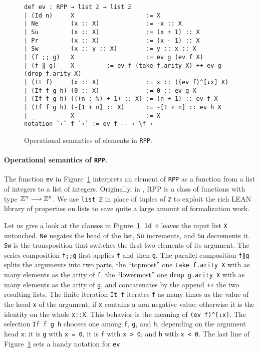 \documentclass[runningheads]{llncs}
\newcommand{\RPP}{\textsf{RPP}\xspace}
\newcommand{\LEAN}{\textsf{LEAN}\xspace}
\begin{document}
\begin{figure}
\begin{lstlisting}
def ev : RPP → list ℤ → list ℤ
| (Id n)     X                    := X
| Ne         (x :: X)             := -x :: X
| Su         (x :: X)             := (x + 1) :: X
| Pr         (x :: X)             := (x - 1) :: X
| Sw         (x :: y :: X)        := y :: x :: X
| (f ;; g)   X                    := ev g (ev f X)
| (f ‖ g)    X         := ev f (take f.arity X) ++ ev g (drop f.arity X)
| (It f)     (x :: X)             := x :: ((ev f)^[↓x] X)
| (If f g h) (0 :: X)             := 0 :: ev g X
| (If f g h) (((n : ℕ) + 1) :: X) := (n + 1) :: ev f X
| (If f g h) (-[1 + n] :: X)      := -[1 + n] :: ev h X
| _          X                    := X
notation `‹` f `›` := ev f -- ‹ \f ›
\end{lstlisting}
\caption{Operational semantics of elements in \lstinline|RPP|.}
\label{fig:RPP-ev}
\end{figure}

\paragraph{Operational semantics of {\normalfont \lstinline|RPP|}.}
The function \lstinline|ev| in Figure~\ref{fig:RPP-ev} interprets an element of \lstinline|RPP| as a function from a list of integers to a list of integers. Originally, in \cite{DBLP:journals/tcs/PaoliniPR20}, \RPP is a class of functions with type $ \mathbb{Z}^n \longrightarrow \mathbb{Z}^n $. We use \lstinline|list ℤ| in place of tuples of \lstinline|ℤ| to exploit the rich \LEAN library of properties on lists to save quite a large amount of formalization work.

Let us give a look at the clauses in Figure~\ref{fig:RPP-ev}.
\lstinline|Id n| leaves the input list \lstinline|X| untouched.
\lstinline|Ne| negates the head of the list, \lstinline|Su| increments, and \lstinline|Su| decrements it.
\lstinline|Sw| is the transposition that switches the first two elements of its argument.
The series composition \lstinline|f;;g| first applies \lstinline|f| and then
\lstinline|g|.
The parallel composition \lstinline|f‖g| splits the arguments into two parts, the ``topmost'' one \lstinline|take f.arity X| with as many elements as the arity of \lstinline|f|, the ``lowermost'' one \lstinline|drop g.arity X| with as many elements as the arity of \lstinline|g|, and concatenates by the append \lstinline|++| the two resulting lists. The finite iteration
\lstinline|It f| iterates \lstinline|f| as many times as the value of the head \lstinline|x| of the argument, if \lstinline|x| contains a non negative value; otherwise it is the identity on the whole \lstinline|x::X|. This behavior is the meaning of \lstinline|(ev f)^[↓x]|.
The selection \lstinline|If f g h| chooses one among \lstinline|f|, \lstinline|g|, and \lstinline|h|, depending on the argument head \lstinline|x|: it is \lstinline|g| with \lstinline|x = 0|, it is \lstinline|f| with \lstinline|x > 0|, and \lstinline|h| with \lstinline|x < 0|.
The last line of Figure~\ref{fig:RPP-ev} sets a handy notation for \lstinline|ev|.
\end{document}
